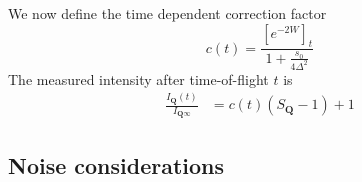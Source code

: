 \documentclass[11pt,letter]{article}
\newcommand{\bv}[1]{\ensuremath{\bm{#1}}}
\newcommand{\Iqtof}{\ensuremath{I_{\bv{Q}\infty} }}
\newcommand{\Iq}{\ensuremath{I_{\bv{Q}} }}
\newcommand{\iqT}{\ensuremath{i_{\bv{Q}_{T}} }}
\begin{document}
We now define the time dependent correction factor 
\begin{equation}
   c(t) =   \frac{ [e^{-2W}]_{t}   } 
           {1 + \frac{s_{0}}{ 4\Delta^{2}} }  
\end{equation}
The measured intensity after time-of-flight $t$ is 
\begin{equation}
\begin{split} 
 \frac{\Iq(t)}{\Iqtof} 
&  = c(t) ( S_{\bv{Q}} - 1 ) + 1 
\end{split}
\end{equation}
\newpage

\subsection{Noise considerations} 
\end{document}

